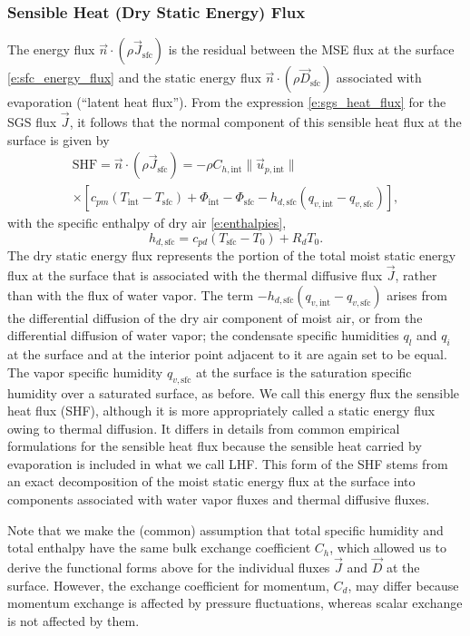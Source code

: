 \documentclass{report}
\begin{document}
\subsubsection{Sensible Heat (Dry Static Energy) Flux} The energy flux $\vec{n} \cdot (\rho \vec{J}_{\mathrm{sfc}})$ is the residual between the MSE flux at the surface \eqref{e:sfc_energy_flux} and the static energy flux $\vec{n} \cdot (\rho \vec{D}_\mathrm{sfc})$ associated with evaporation (``latent heat flux''). From the expression \eqref{e:sgs_heat_flux} for the SGS flux $\vec{J}$, it follows that the normal component of this sensible heat flux at the surface is given by 
\begin{multline}\label{e:sfc_SHF}
    \mathrm{SHF} = \vec{n} \cdot (\rho \vec{J}_{\mathrm{sfc}}) =
    -\rho C_{h, \mathrm{int}} \| \vec{u}_{p, \mathrm{int}} \|
    \\
    \times \left[ c_{pm} \left(T_\mathrm{int} - T_\mathrm{sfc} \right) + \Phi_\mathrm{int} - \Phi_\mathrm{sfc}
    - h_{d,\mathrm{sfc}}  \left( q_{v, \mathrm{int}} - q_{v, \mathrm{sfc}} \right) \right],
\end{multline}
with the specific enthalpy of dry air \eqref{e:enthalpies},
\[
h_{d, \mathrm{sfc}} = c_{pd} (T_\mathrm{sfc} - T_0) + R_d T_0.
\]
The dry static energy flux represents the portion of the total moist static energy flux at the surface that is associated with the thermal diffusive flux $\vec{J}$, rather than with the flux of water vapor. The term $-h_{d,\mathrm{sfc}}  \left( q_{v, \mathrm{int}} - q_{v, \mathrm{sfc}} \right)$ arises from the differential diffusion of the dry air component of moist air, or from the differential diffusion of water vapor; the condensate specific humidities $q_l$ and $q_i$ at the surface and at the interior point adjacent to it are again set to be equal. The vapor specific humidity $q_{v, \mathrm{sfc}}$ at the surface is the saturation specific humidity over a saturated surface, as before. We call this energy flux the sensible heat flux (SHF), although it is more appropriately called a static energy flux owing to thermal diffusion. It differs in details from common empirical formulations for the sensible heat flux because the sensible heat carried by evaporation is included in what we call LHF. This form of the SHF stems from an exact decomposition of the moist static energy flux at the surface into components associated with water vapor fluxes and thermal diffusive fluxes.

Note that we make the (common) assumption that total specific humidity and total enthalpy have the same bulk exchange coefficient $C_h$, which allowed us to derive the functional forms above for the individual fluxes $\vec{J}$ and $\vec{D}$ at the surface.  However, the exchange coefficient for momentum, $C_d$, may differ because momentum exchange is affected by pressure fluctuations, whereas scalar exchange is not affected by them.
\end{document}
